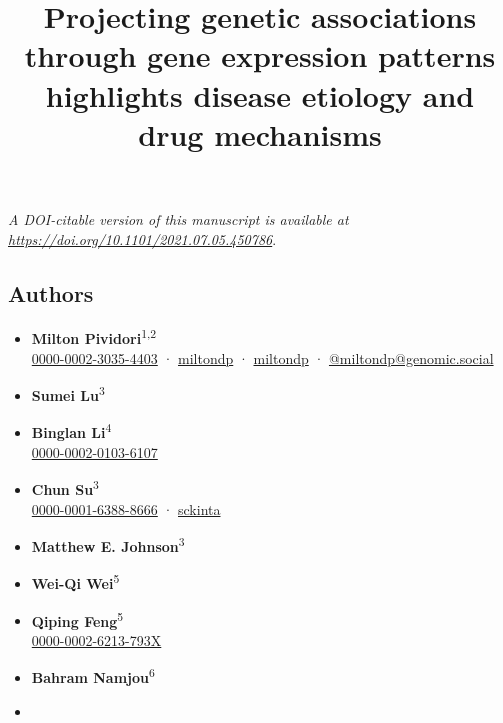 \documentclass[
  a4paper,
]{article}
\title{Projecting genetic associations through gene expression patterns highlights disease etiology and drug mechanisms}
\author{}
\date{}
\begin{document}
\maketitle

\emph{A DOI-citable version of this manuscript is available at \url{https://doi.org/10.1101/2021.07.05.450786}}.

\hypertarget{authors}{%
\subsection{Authors}\label{authors}}

\begin{itemize}
\item
  \textbf{Milton Pividori}\textsuperscript{1,2} \\
  
  \href{https://orcid.org/0000-0002-3035-4403}{0000-0002-3035-4403}
  · 
  \href{https://github.com/miltondp}{miltondp}
  · 
  \href{https://twitter.com/miltondp}{miltondp}
  · 
  \href{https://genomic.social/@miltondp}{@miltondp@genomic.social}
\item
  \textbf{Sumei Lu}\textsuperscript{3}
\item
  \textbf{Binglan Li}\textsuperscript{4} \\
  
  \href{https://orcid.org/0000-0002-0103-6107}{0000-0002-0103-6107}
\item
  \textbf{Chun Su}\textsuperscript{3} \\
  
  \href{https://orcid.org/0000-0001-6388-8666}{0000-0001-6388-8666}
  · 
  \href{https://github.com/sckinta}{sckinta}
\item
  \textbf{Matthew E. Johnson}\textsuperscript{3}
\item
  \textbf{Wei-Qi Wei}\textsuperscript{5}
\item
  \textbf{Qiping Feng}\textsuperscript{5} \\
  
  \href{https://orcid.org/0000-0002-6213-793X}{0000-0002-6213-793X}
\item
  \textbf{Bahram Namjou}\textsuperscript{6}
\item

\end{itemize}
\end{document}
